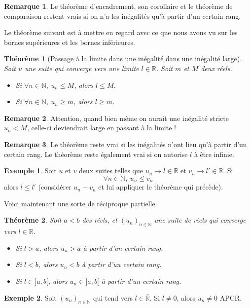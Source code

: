 \documentclass[french]{book}
\newcommand{\N}{\mathbb{N}}
\newcommand{\R}{\mathbb{R}}
\theoremstyle{plain}
\newtheorem{thm}{Théorème}[chapter]
\theoremstyle{definition}
\newtheorem{exa}{Exemple}[chapter]
\newtheorem{rmq}{Remarque}[chapter]
\theoremstyle{remark}
\begin{document}
\begin{rmq}
	Le théorème d'encadrement, son corollaire et le théorème de comparaison restent vrais si on n'a les inégalités qu'à partir d'un certain rang.
\end{rmq}
Le théorème suivant est à mettre en regard avec ce que nous avons vu sur les bornes supérieures et les bornes inférieures.
\begin{thm}[Passage à la limite dans une inégalité dans une inégalité large]
	Soit $u$ une suite qui converge vers une limite $l\in\R$. Soit $m$ et $M$ deux réels. \begin{itemize}
		\item Si $\forall n\in\N,\ u_n\leqslant M$, alors $l\leqslant M$.
		\item Si $\forall n\in\N,\ u_n\geqslant m$, alors $l\geqslant m$.
	\end{itemize}
\end{thm}
\begin{rmq}
	Attention, quand bien même on aurait une inégalité stricte $u_n<M$, celle-ci deviendrait large en passant à la limite !
\end{rmq}
\begin{rmq}
	Le théorème reste vrai si les inégalités n'ont lieu qu'à partir d'un certain rang. Le théorème reste également vrai si on autorise $l$ à être infinie.
\end{rmq}
\begin{exa}
	Soit $u$ et $v$ deux suites telles que $u_n\rightarrow l\in\R$ et $v_n\rightarrow l'\in\R$. Si $$\forall n\in\N,\ u_n\leqslant v_n$$ alors $l\leqslant l'$ (considérer $u_n-v_n$ et lui appliquer le théorème qui précède).
\end{exa}
Voici maintenant une sorte de réciproque partielle.
\begin{thm}
	Soit $a<b$ des réels, et $(u_n)_{n\in\N}$ une suite de réels qui converge vers $l\in\R$.
	\begin{itemize}
		\item Si $l>a$, alors $u_n>a$ à partir d'un certain rang.
		\item Si $l<b$, alors $u_n<b$ à partir d'un certain rang.
		\item Si $l\in]a,b[$, alors $u_n\in]a,b[$ à partir d'un certain rang.
	\end{itemize}
\end{thm}
\begin{exa}
	Soit $(u_n)_{n\in\N}$ qui tend vers $l\in\overline{\R}$. Si $l\ne0$, alors $u_n\ne0$ APCR.
\end{exa}
\end{document}
